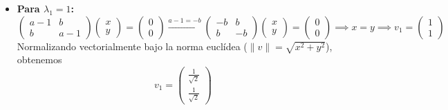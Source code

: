 \begin{ejemplo}
\begin{description}
        \begin{itemize}
            \item \textbf{Para $\lambda_1 = 1$:}
            \[ 
            \begin{pmatrix} a-1 & b \\ b & a-1 \end{pmatrix}\begin{pmatrix} x \\ y \end{pmatrix} = \begin{pmatrix} 0 \\ 0 \end{pmatrix} \xrightarrow{a-1 = -b} \begin{pmatrix} -b & b \\ b & -b \end{pmatrix}\begin{pmatrix} x \\ y \end{pmatrix} = \begin{pmatrix} 0 \\ 0 \end{pmatrix} \implies x = y \implies v_1 = \begin{pmatrix} 1 \\ 1 \end{pmatrix}
            \]
            Normalizando vectorialmente bajo la norma euclídea ($\|v\| = \sqrt{x^2+y^2}$), obtenemos
            $$v_1 = \begin{pmatrix} \frac{1}{\sqrt{2}} \\[0.1cm] \frac{1}{\sqrt{2}} \end{pmatrix}$$
            

\end{itemize}
\end{description}
\end{ejemplo}
